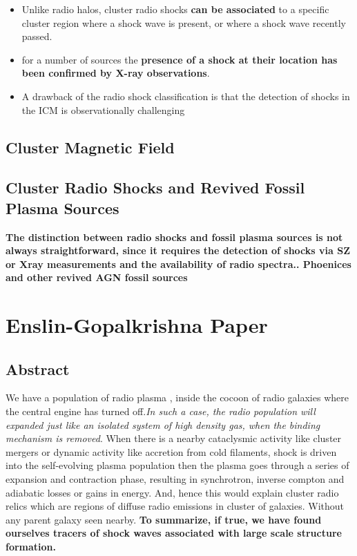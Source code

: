 \documentclass[12pt]{report}
\newcommand{\tbf}[1]{\textbf{#1}}
\newcommand{\tit}[1]{\textit{#1}}
\begin{document}
\begin{itemize}
\begin{itemize}
 \item  Unlike radio halos, cluster radio shocks \tbf{can be associated} to a specific cluster region where a shock wave is present, or where a shock wave recently passed.
 \item for a number of sources the \tbf{presence of a shock at their location has been confirmed by X-ray observations}.
 \item  A drawback of the radio shock classification is that the detection of shocks in the ICM is observationally challenging
 \end{itemize}
 
 \end{itemize}
 \section{Cluster Magnetic Field}
 \section{Cluster Radio Shocks and Revived Fossil Plasma Sources}
 \textbf{The distinction between radio shocks and fossil plasma sources is not always straightforward, since it requires the detection of shocks via SZ or Xray measurements and the availability of radio spectra.. Phoenices and other revived AGN fossil sources  }

\chapter{Enslin-Gopalkrishna Paper}
\section{Abstract}
We have a population of radio plasma , inside the cocoon of radio galaxies where the central engine has turned off.\tit{In such a case, the radio population will expanded just like an isolated system of high density gas, when the binding mechanism is removed}. When there is a nearby cataclysmic activity like cluster mergers or dynamic activity like accretion from cold filaments, shock is driven into the self-evolving plasma population then the plasma goes through a series of expansion and contraction phase, resulting in synchrotron, inverse compton and adiabatic losses or gains in energy. And, hence this would explain cluster radio relics which are regions of diffuse radio emissions in cluster of galaxies. Without any parent galaxy seen nearby. \tbf{To summarize, if true, we have found ourselves tracers of shock waves associated with large scale structure formation.}
\end{document}
